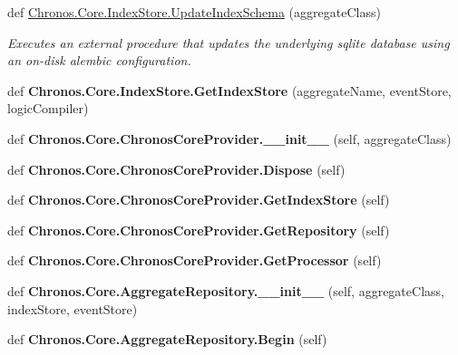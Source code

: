 \begin{DoxyCompactItemize}
def \hyperlink{group__Chronos_ga03ff3b6b6e521bc886259e7b8f390819}{Chronos.\+Core.\+Index\+Store.\+Update\+Index\+Schema} (aggregate\+Class)
\begin{DoxyCompactList}\small\item\em Executes an external procedure that updates the underlying sqlite database using an on-\/disk alembic configuration. \end{DoxyCompactList}\item 
def {\bfseries Chronos.\+Core.\+Index\+Store.\+Get\+Index\+Store} (aggregate\+Name, event\+Store, logic\+Compiler)\hypertarget{group__Chronos_ga3530ff791a9e1b25972acfe5fe26c13d}{}\label{group__Chronos_ga3530ff791a9e1b25972acfe5fe26c13d}

\item 
def {\bfseries Chronos.\+Core.\+Chronos\+Core\+Provider.\+\_\+\+\_\+init\+\_\+\+\_\+} (self, aggregate\+Class)\hypertarget{group__Chronos_ga6ead6cc82735e5990a4f445b7e689300}{}\label{group__Chronos_ga6ead6cc82735e5990a4f445b7e689300}

\item 
def {\bfseries Chronos.\+Core.\+Chronos\+Core\+Provider.\+Dispose} (self)\hypertarget{group__Chronos_ga21d49fe5c9d867ffedb27c20771614e4}{}\label{group__Chronos_ga21d49fe5c9d867ffedb27c20771614e4}

\item 
def {\bfseries Chronos.\+Core.\+Chronos\+Core\+Provider.\+Get\+Index\+Store} (self)\hypertarget{group__Chronos_ga8968d4953a1a919db4928b3c970b3c06}{}\label{group__Chronos_ga8968d4953a1a919db4928b3c970b3c06}

\item 
def {\bfseries Chronos.\+Core.\+Chronos\+Core\+Provider.\+Get\+Repository} (self)\hypertarget{group__Chronos_ga049c9f3a095f7ea9d88db2bdcafb9988}{}\label{group__Chronos_ga049c9f3a095f7ea9d88db2bdcafb9988}

\item 
def {\bfseries Chronos.\+Core.\+Chronos\+Core\+Provider.\+Get\+Processor} (self)\hypertarget{group__Chronos_gabebf3b6a1c04b89583b22e30466e980c}{}\label{group__Chronos_gabebf3b6a1c04b89583b22e30466e980c}

\item 
def {\bfseries Chronos.\+Core.\+Aggregate\+Repository.\+\_\+\+\_\+init\+\_\+\+\_\+} (self, aggregate\+Class, index\+Store, event\+Store)\hypertarget{group__Chronos_ga174c9e419f075d080c8a52f9f33d9fe5}{}\label{group__Chronos_ga174c9e419f075d080c8a52f9f33d9fe5}

\item 
def {\bfseries Chronos.\+Core.\+Aggregate\+Repository.\+Begin} (self)\hypertarget{group__Chronos_ga6093f4f4c86fe11071e7cc8d92d85143}{}\label{group__Chronos_ga6093f4f4c86fe11071e7cc8d92d85143}


\end{DoxyCompactItemize}
